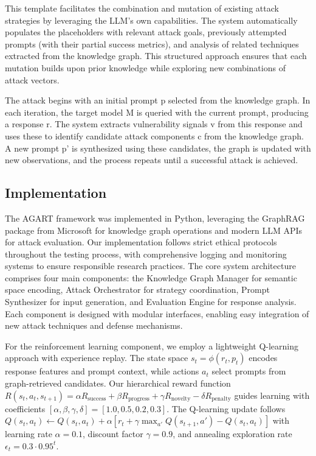 This template facilitates the combination and mutation of existing attack strategies by leveraging the LLM's own capabilities. The system automatically populates the placeholders with relevant attack goals, previously attempted prompts (with their partial success metrics), and analysis of related techniques extracted from the knowledge graph. This structured approach ensures that each mutation builds upon prior knowledge while exploring new combinations of attack vectors.

The attack begins with an initial prompt p selected from the knowledge graph. In each iteration, the target model M is queried with the current prompt, producing a response r. The system extracts vulnerability signals v from this response and uses these to identify candidate attack components c from the knowledge graph. A new prompt p' is synthesized using these candidates, the graph is updated with new observations, and the process repeats until a successful attack is achieved.

\subsection{Implementation}

The AGART framework was implemented in Python, leveraging the GraphRAG package from Microsoft\cite{GraphRAG} for knowledge graph operations and modern LLM APIs for attack evaluation. Our implementation follows strict ethical protocols throughout the testing process, with comprehensive logging and monitoring systems to ensure responsible research practices. The core system architecture comprises four main components: the Knowledge Graph Manager for semantic space encoding, Attack Orchestrator for strategy coordination, Prompt Synthesizer for input generation, and Evaluation Engine for response analysis. Each component is designed with modular interfaces, enabling easy integration of new attack techniques and defense mechanisms.

For the reinforcement learning component, we employ a lightweight Q-learning approach with experience replay. The state space $s_t = \phi(r_t, p_t)$ encodes response features and prompt context, while actions $a_t$ select prompts from graph-retrieved candidates. Our hierarchical reward function $R(s_t, a_t, s_{t+1}) = \alpha R_{\text{success}} + \beta R_{\text{progress}} + \gamma R_{\text{novelty}} - \delta R_{\text{penalty}}$ guides learning with coefficients $[\alpha, \beta, \gamma, \delta] = [1.0, 0.5, 0.2, 0.3]$. The Q-learning update follows $Q(s_t, a_t) \leftarrow Q(s_t, a_t) + \alpha[r_t + \gamma \max_{a'} Q(s_{t+1}, a') - Q(s_t, a_t)]$ with learning rate $\alpha = 0.1$, discount factor $\gamma = 0.9$, and annealing exploration rate $\epsilon_t = 0.3 \cdot 0.95^t$.

